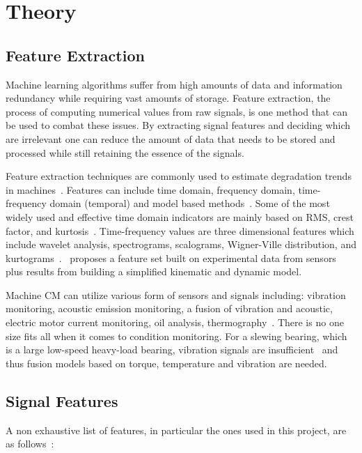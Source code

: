 \documentclass[]{article}
\begin{document}
\section{Theory}
\subsection{Feature Extraction}
Machine learning algorithms suffer from high amounts of data and information redundancy while requiring vast amounts of storage. Feature extraction, the process of computing numerical values from raw signals, is one method that can be used to combat these issues. By extracting signal features and deciding which are irrelevant one can reduce the amount of data that needs to be stored and processed while still retaining the essence of the signals.

Feature extraction techniques are commonly used to estimate degradation trends in machines~\cite{caesarendra2017review,adams2017comparison,hong2014condition}.
Features can include time domain, frequency domain, time-frequency domain (temporal) and model based methods~\cite{teti2010advanced}. Some of the most widely used and effective time domain indicators are mainly based on \gls{RMS}, crest factor, and kurtosis~\cite{soualhi2021novel}. Time-frequency values are three dimensional features which include wavelet analysis, spectrograms, scalograms, Wigner-Ville distribution, and kurtograms~\cite{soualhi2021novel}.~\cite{d2019physical} proposes a feature set built on experimental data from sensors plus results from building a simplified kinematic and dynamic model.

Machine \gls{CM} can utilize various form of sensors and signals including: vibration monitoring, acoustic emission monitoring, a fusion of vibration and acoustic, electric motor current monitoring, oil analysis, thermography~\cite{ahmed2020condition}. There is no one size fits all when it comes to condition monitoring. For a slewing bearing, which is a large low-speed heavy-load bearing, vibration signals are insufficient~\cite{wang2016multiple} and thus fusion models based on torque, temperature and vibration are needed.

\subsection{Signal Features} 	
A non exhaustive list of features, in particular the ones used in this project, are as follows~\cite{diagnosticFeatureDesigner}:
\end{document}
